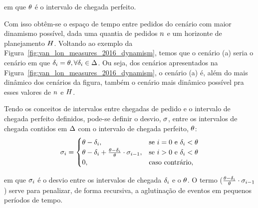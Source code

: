 \noindent em que $\theta$ é o intervalo de chegada perfeito.

Com isso obtêm-se o espaço de tempo entre pedidos do cenário com maior
dinamismo possível, dada uma quantia de pedidos $n$ 
e um horizonte de planejamento $H$.
Voltando ao exemplo da Figura~\ref{fig:van_lon_measures_2016_dynamism},
temos que o cenário (a) seria o cenário em que
$\delta_i = \theta, \forall
\delta_i \in \Delta$.
Ou seja, dos cenários apresentados na 
Figura~\ref{fig:van_lon_measures_2016_dynamism}, o cenário (a) é, além do mais
dinâmico dos cenários da figura, também o cenário mais dinâmico possível pra
esses valores de $n$ e $H$.

Tendo os conceitos de intervalos entre chegadas de pedido e o intervalo de
chegada perfeito definidos, pode-se definir o desvio,
$\sigma$, entre os intervalos de chegada contidos em
$\Delta$ com o intervalo de chegada perfeito,
$\theta$:
%
\begin{equation}
    \sigma_i =
        \begin{cases}
            \theta - \delta_i,
            & \text{se $i = 0$ 
                    e $\delta_i < \theta$} \\
            \theta - \delta_i 
            + \frac{\theta-\delta_i}
                   {\theta}
            \cdot \sigma_{i-1},
            & \text{se $i > 0$ 
                    e $\delta_i < \theta$} \\
            0, & \text{caso contrário},
        \end{cases}
    \label{eq:van_lon_measures_2016_deviationFromPerfectInterval}
\end{equation}

\noindent em que $\sigma_i$ é o desvio 
entre os intervalos de chegada $\delta_i$ e o 
$\theta$. 
O termo ($\frac{\theta-\delta_i}
{\theta} \cdot \sigma_{i-1}$) serve para 
penalizar, de forma recursiva, a aglutinação de eventos em pequenos 
períodos de tempo.


